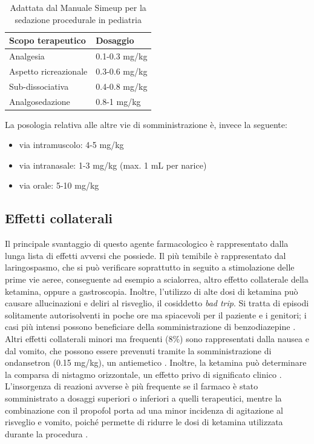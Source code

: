 \begin{table}[!h]
    \centering
    \begin{tabular}{|l|l|}
       Scopo terapeutico     & Dosaggio \\ \hline
       Analgesia & 0.1-0.3 mg/kg  \\
       Aspetto ricreazionale & 0.3-0.6 mg/kg \\
       Sub-dissociativa & 0.4-0.8 mg/kg \\
       Analgosedazione & 0.8-1 mg/kg 
    \end{tabular}
    \caption{Adattata dal Manuale Simeup per la sedazione procedurale in pediatria \cite{Simeupsedazione}}
    \label{tab:1}
\end{table}

\bigskip

La posologia relativa alle altre vie di somministrazione è, invece la seguente: 
\begin{itemize}
    \item via intramuscolo: 4-5 mg/kg
    \item via intranasale: 1-3 mg/kg (max. 1 mL per narice)
    \item via orale: 5-10 mg/kg
\end{itemize}

\subsection*{Effetti collaterali}

Il principale svantaggio di questo agente farmacologico è rappresentato dalla lunga lista di effetti avversi che possiede. Il più temibile è rappresentato dal laringospasmo, che si può verificare soprattutto in seguito a stimolazione delle prime vie aeree, conseguente ad esempio a scialorrea, altro effetto collaterale della ketamina, oppure a gastroscopia. Inoltre, l'utilizzo di alte dosi di ketamina può causare allucinazioni e deliri al risveglio, il cosiddetto \emph{bad trip}. Si tratta di episodi solitamente autorisolventi in poche ore ma spiacevoli per il paziente e i genitori; i casi più intensi possono beneficiare della somministrazione di benzodiazepine \cite{Simeupsedazione}. Altri effetti collaterali minori ma frequenti (8\%) sono rappresentati dalla nausea e dal vomito, che possono essere prevenuti tramite la somministrazione di ondansetron (0.15 mg/kg), un antiemetico \cite{Uptodatepharmacology}. Inoltre, la ketamina può determinare la comparsa di nistagmo orizzontale, un effetto privo di significato clinico \cite{Simeupsedazione}. 
\\L'insorgenza di reazioni avverse è più frequente se il farmaco è stato somministrato a dosaggi superiori o inferiori a quelli terapeutici, mentre la combinazione con il propofol porta ad una minor incidenza di agitazione al risveglio e vomito, poiché permette di ridurre le dosi di ketamina utilizzata durante la procedura \cite{Simeupsedazione, Shah2011}. 

